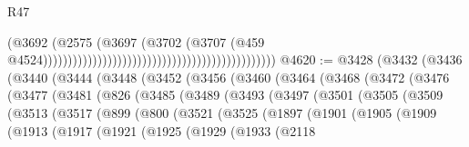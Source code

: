 \begin{lexlean}{R47}
\begin{coremodule}
                                                                                      (@3692
                                                                                        (@2575
                                                                                          (@3697
                                                                                            (@3702
                                                                                              (@3707
                                                                                                (@459
                                                                                                  @4524)))))))))))))))))))))))))))))))))))))))))))))))
@4620 := @3428
    (@3432
      (@3436
        (@3440
          (@3444
            (@3448
              (@3452
                (@3456
                  (@3460
                    (@3464
                      (@3468
                        (@3472
                          (@3476
                            (@3477
                              (@3481
                                (@826
                                  (@3485
                                    (@3489
                                      (@3493
                                        (@3497
                                          (@3501
                                            (@3505
                                              (@3509
                                                (@3513
                                                  (@3517
                                                    (@899
                                                      (@800
                                                        (@3521
                                                          (@3525
                                                            (@1897
                                                              (@1901
                                                                (@1905
                                                                  (@1909
                                                                    (@1913
                                                                      (@1917
                                                                        (@1921
                                                                          (@1925
                                                                            (@1929
                                                                              (@1933
                                                                                (@2118

\end{coremodule}
\end{lexlean}
